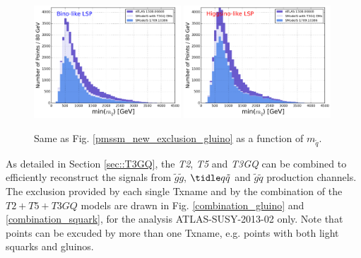 \documentclass[a4paper,11pt]{article}
\newcommand{\MSQ}{$ m _{ \tilde q } $\xspace}
\begin{document}
\begin{figure}[!]
\begin{center}
\subfigure
\includegraphics[width=0.49\textwidth]{PLOTS/BINO_Comparison_Squark.png}
\subfigure
{\includegraphics[width=0.49\textwidth]{PLOTS/HIGGSINO_Comparison_Squark.png}}
\end{center}
\caption{Same as Fig. \ref{pmssm_new_exclusion_gluino} as a function of \MSQ.} 
\label{pmssm_new_exclusion_squark}
\end{figure}
%
%
As detailed in Section \ref{sec::T3GQ}, the \textit{T2}, \textit{T5} and \textit{T3GQ} can be combined to efficiently reconstruct the signals from $\tilde g \tilde g$, $\tidle q \tilde q$ and $\tilde g \tilde q$ production channels. The exclusion provided by each single Txname and by the combination of the $T2+T5+T3GQ$ models are drawn in Fig. 
\ref{combination_gluino} and \ref{combination_squark}, for the analysis ATLAS-SUSY-2013-02 only. Note that points can be excuded by more than one Txname, e.g. points with both light squarks and gluinos. 
\end{document}
